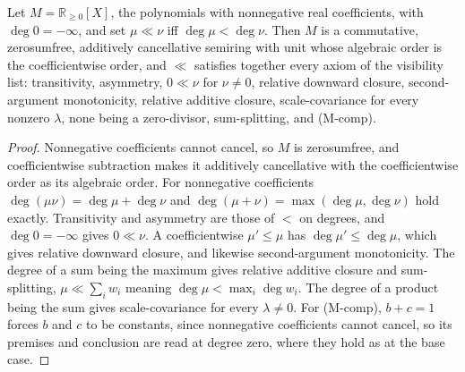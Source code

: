 \begin{prop}\label{prop:polymodel}
Let $M = \mathbb{R}_{\ge 0}[X]$, the polynomials with nonnegative real coefficients, with $\deg 0 = -\infty$, and set $\mu \ll \nu$ iff $\deg\mu < \deg\nu$. Then $M$ is a commutative, zerosumfree, additively cancellative semiring with unit whose algebraic order is the coefficientwise order, and $\ll$ satisfies together every axiom of the visibility list: transitivity, asymmetry, $0 \ll \nu$ for $\nu \ne 0$, relative downward closure, second-argument monotonicity, relative additive closure, scale-covariance for every nonzero $\lambda$, none being a zero-divisor, sum-splitting, and (M-comp).
\end{prop}
\begin{proof}
Nonnegative coefficients cannot cancel, so $M$ is zerosumfree, and coefficientwise subtraction makes it additively cancellative with the coefficientwise order as its algebraic order. For nonnegative coefficients $\deg(\mu\nu) = \deg\mu + \deg\nu$ and $\deg(\mu + \nu) = \max(\deg\mu, \deg\nu)$ hold exactly. Transitivity and asymmetry are those of $<$ on degrees, and $\deg 0 = -\infty$ gives $0 \ll \nu$. A coefficientwise $\mu' \le \mu$ has $\deg\mu' \le \deg\mu$, which gives relative downward closure, and likewise second-argument monotonicity. The degree of a sum being the maximum gives relative additive closure and sum-splitting, $\mu \ll \sum_i w_i$ meaning $\deg\mu < \max_i \deg w_i$. The degree of a product being the sum gives scale-covariance for every $\lambda \ne 0$. For (M-comp), $b + c = 1$ forces $b$ and $c$ to be constants, since nonnegative coefficients cannot cancel, so its premises and conclusion are read at degree zero, where they hold as at the base case.
\end{proof}

